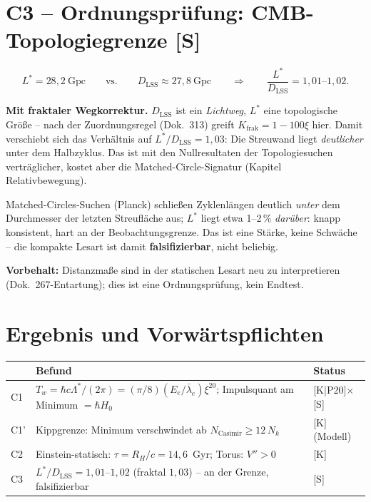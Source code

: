 \section{C3 -- Ordnungsprüfung: CMB-Topologiegrenze [S]}

\begin{equation}
  L^{*} = 28{,}2~\text{Gpc}
  \qquad\text{vs.}\qquad
  D_\text{LSS} \approx 27{,}8~\text{Gpc}
  \qquad\Rightarrow\qquad
  \frac{L^{*}}{D_\text{LSS}} = 1{,}01\text{--}1{,}02.
\end{equation}

\textbf{Mit fraktaler Wegkorrektur.} $D_\text{LSS}$ ist ein
\emph{Lichtweg}, $L^{*}$ eine topologische Größe -- nach der
Zuordnungsregel (Dok.~313) greift $K_\text{frak} = 1-100\xi$
hier. Damit verschiebt sich das Verhältnis auf
$L^{*}/D_\text{LSS} = 1{,}03$: Die Streuwand liegt
\emph{deutlicher} unter dem Halbzyklus. Das ist mit den
Nullresultaten der Topologiesuchen verträglicher, kostet aber die
Matched-Circle-Signatur (Kapitel Relativbewegung).

Matched-Circles-Suchen (Planck) schließen Zyklenlängen deutlich
\emph{unter} dem Durchmesser der letzten Streufläche aus; $L^{*}$
liegt etwa 1--2\,\% \emph{darüber}: knapp konsistent, hart an der
Beobachtungsgrenze. Das ist eine Stärke, keine Schwäche -- die
kompakte Lesart ist damit \textbf{falsifizierbar}, nicht beliebig.

\textbf{Vorbehalt:} Distanzmaße sind in der statischen Lesart neu zu
interpretieren (Dok.~267-Entartung); dies ist eine Ordnungsprüfung,
kein Endtest.

\section{Ergebnis und Vorwärtspflichten}

\begin{center}
\begin{tabular}{lp{7.2cm}l}
\toprule
& Befund & Status \\
\midrule
C1 & $T_w = \hbar c\Lambda^{*}/(2\pi) = (\pi/8)(E_e/\bar\lambda_e)\xi^{20}$;
     Impulsquant am Minimum $= \hbar H_0$ & [K|P20]$\times$[S] \\
C1' & Kippgrenze: Minimum verschwindet ab
     $N_\text{Casimir} \ge 12\,N_k$ & [K] (Modell) \\
C2 & Einstein-statisch: $\tau = R_H/c = 14{,}6$~Gyr;
     Torus: $V'' > 0$ & [K] \\
C3 & $L^{*}/D_\text{LSS} = 1{,}01$--$1{,}02$ (fraktal $1{,}03$) -- an der Grenze,
     falsifizierbar & [S] \\
\bottomrule
\end{tabular}
\end{center}

